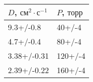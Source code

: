 \begin{tabular}{ll}
\toprule
$D$, $см^2 \cdot с^{-1}$ & $P$, $торр$ \\
\midrule
9.3+/-0.8 & 40+/-4 \\
4.7+/-0.4 & 80+/-4 \\
3.38+/-0.31 & 120+/-4 \\
2.39+/-0.22 & 160+/-4 \\
\bottomrule
\end{tabular}
